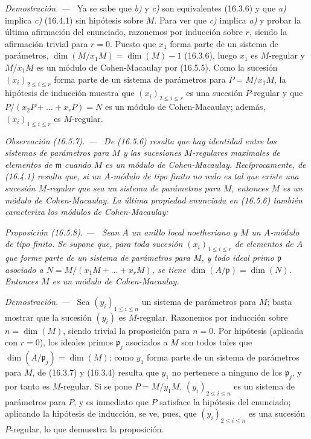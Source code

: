 \documentclass[10pt,oneside]{book}
\makeatletter
\newcommand{\setmanualcurrentlabel}[1]{\def\@currentlabel{#1}}
\newcommand{\oldpage}[2][]{%
  \setcounter{footnote}{0}%
  \marginpar{\scriptsize\textbf{#1}~|~#2}\ignorespaces}
\newenvironment{proposition}[1][]{%
  \setmanualcurrentlabel{#1}\par\medskip\noindent\itshape Proposición (#1). ---\ }{\par}
\newenvironment{remark}[1][]{%
  \setmanualcurrentlabel{#1}\par\medskip\noindent\itshape Observación (#1). ---\ }{\par}
\newenvironment{proof}{%
  \par\medskip\noindent\textit{Demostración. ---\ }}{\par}
\providecommand{\setmin}{-}%
\makeatother
\begin{document}
\begin{proof}
Ya se sabe que \emph{b)} y \emph{c)} son equivalentes (16.3.6) y que \emph{a)} implica \emph{c)}
(16.4.1) sin hipótesis sobre $M$. Para ver que \emph{c)} implica \emph{a)} y probar la
última afirmación del enunciado, razonemos por inducción sobre $r$, siendo la
afirmación trivial para $r=0$. Puesto que $x_1$ forma parte de un sistema de
parámetros, $\dim(M/x_1M)=\dim(M)\setmin 1$ (16.3.6), luego $x_1$ es $M$-regular y
$M/x_1M$ es un módulo de Cohen-Macaulay por (16.5.5). Como la sucesión
$(x_i)_{2\leq i\leq r}$ forma parte de un sistema de parámetros para
$P=M/x_1M$, la hipótesis de inducción muestra que $(x_i)_{2\leq i\leq r}$ es
una sucesión $P$-regular y que
$P/(x_2P+\ldots+x_rP)=N$ es un módulo de Cohen-Macaulay; además,
$(x_i)_{1\leq i\leq r}$ es $M$-regular.
\end{proof}

\begin{remark}[16.5.7]
\label{0.16.5.7-es}
De (16.5.6) resulta que hay identidad entre los \emph{sistemas de
parámetros para $M$ y las sucesiones $M$-regulares maximales de elementos de
$\mathfrak{m}$} cuando $M$ es un módulo de Cohen-Macaulay. Recíprocamente, de
(16.4.1) resulta que, si un $A$-módulo de tipo finito no nulo es tal que existe
\emph{una} sucesión $M$-regular que sea un sistema de parámetros para $M$, entonces
$M$ es un módulo de Cohen-Macaulay. La última propiedad enunciada en
(16.5.6) también \emph{caracteriza} los módulos de Cohen-Macaulay:
\end{remark}

\begin{proposition}[16.5.8]
\label{0.16.5.8-es}
Sean $A$ un anillo local noetheriano y $M$ un $A$-módulo de tipo finito. Se
supone que, para toda sucesión $(x_i)_{1\leq i\leq r}$ de elementos de $A$
que forme parte de un sistema de parámetros para $M$, y todo ideal primo
$\mathfrak{p}$ asociado a
$N=M/(x_1M+\ldots+x_rM)$, se tiene
$\dim(A/\mathfrak{p})=\dim(N)$. Entonces $M$ es un módulo de Cohen-Macaulay.
\end{proposition}

\begin{proof}
Sea $(y_i)_{1\leq i\leq n}$ un sistema de parámetros para $M$; basta
mostrar que la sucesión $(y_i)$ es $M$-regular. Razonemos por inducción sobre
$n=\dim(M)$, siendo trivial la proposición para $n=0$. Por hipótesis
(aplicada con $r=0$), los ideales primos $\mathfrak{p}_j$ asociados a $M$
son todos tales que $\dim(A/\mathfrak{p}_j)=\dim(M)$; como $y_1$ forma parte
de un sistema de parámetros
\oldpage[0\textsubscript{IV-1}]{38}
para $M$, de (16.3.7) y (16.3.4) resulta que $y_1$ no pertenece a ninguno
de los $\mathfrak{p}_j$, y por tanto es $M$-regular. Si se pone $P=M/y_1M$,
$(y_i)_{2\leq i\leq n}$ es un sistema de parámetros para $P$, y es
inmediato que $P$ satisface la hipótesis del enunciado; aplicando la hipótesis
de inducción, se ve, pues, que $(y_i)_{2\leq i\leq n}$ es una sucesión
$P$-regular, lo que demuestra la proposición.
\end{proof}
\end{document}
